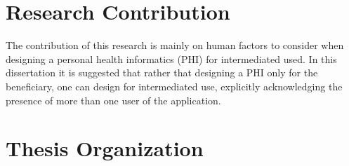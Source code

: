 \section{Research Contribution}
The contribution of this research is mainly on human factors to consider when designing a personal health informatics (PHI) for intermediated used. In this dissertation it is suggested that rather that designing a PHI only for the beneficiary, one can design for intermediated use, explicitly acknowledging the presence of more than one user of the application.
\section{Thesis Organization}

\begin{flushright}
\end{flushright}
